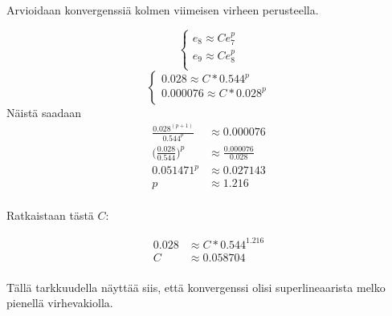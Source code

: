 \documentclass{article}
\begin{document}
Arvioidaan konvergenssiä kolmen viimeisen virheen perusteella.

\[
  \begin{cases}
    e_8 \approx Ce_7^p \\
    e_9 \approx Ce_8^p \\
  \end{cases}
\]
\[
  \begin{cases}
    0.028 \approx C*0.544^p \\
    0.000076 \approx C*0.028^p \\
  \end{cases}
\]
Näistä saadaan
\begin{align*}
  \frac{0.028^{(p+1)}}{0.544^p} &\approx 0.000076 \\
  \Big(\frac{0.028}{0.544}\Big)^p &\approx \frac{0.000076}{0.028} \\
  0.051471^p &\approx 0.027143 \\
  p &\approx 1.216 \\
\end{align*}

Ratkaistaan tästä $C$:

\begin{align*}
  0.028 &\approx C*0.544^{1.216} \\
  C &\approx 0.058704 \\
\end{align*}

Tällä tarkkuudella näyttää siis, että konvergenssi olisi superlineaarista
melko pienellä virhevakiolla.
\end{document}
